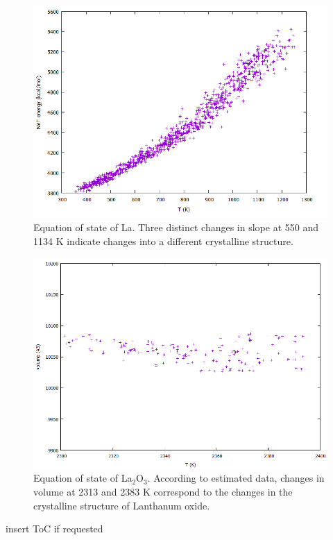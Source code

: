 \documentclass[journal=jpcafh,manuscript=article]{achemso}
\begin{document}
\pagebreak

\begin{figure}[hbtp]
\centering
\includegraphics[scale=0.75]{Paper/images/La-nvt-EvsT.png}
\caption{Equation of state of La. Three distinct changes in slope at 550 and 1134 K indicate changes into a different crystalline structure.}
\label{fig:la-nvt-EvsT}
\end{figure}

\pagebreak


\begin{figure}[hbtp]
\centering
\includegraphics[scale=0.75]{Paper/images/La2O3-VvsT.png}
\caption{Equation of state of La$_2$O$_3$. According to estimated data, changes in volume at 2313 and 2383 K correspond to the changes in the crystalline structure of Lanthanum oxide.}
\label{fig:la2O3-npt-VvsT}
\end{figure}

\pagebreak


\pagebreak
\begin{tocentry}
\begin{center}
insert ToC if requested
\end{center}
\end{tocentry}
\end{document}
